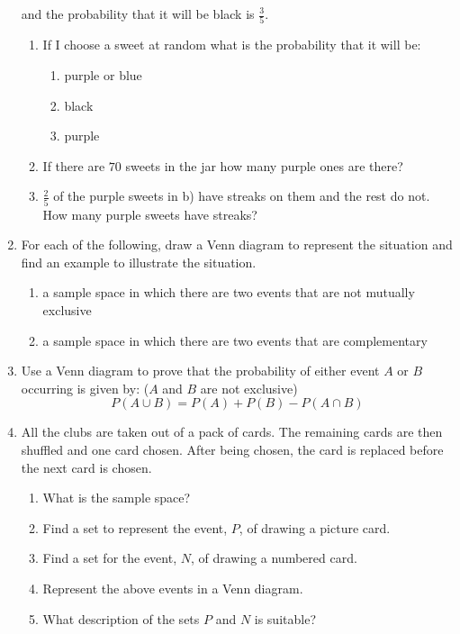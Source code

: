 \begin{eocexercises}{}
\begin{enumerate}[itemsep=5pt, label=\textbf{\arabic*}. ]
    and the probability that it will be black is $\frac{3}{5}$.
    \begin{enumerate}[noitemsep, label=\textbf{(\alph*)} ]
    \item If I choose a sweet at random what
      is the probability that it will be:
      \begin{enumerate}
      \item purple or blue
      \item black
      \item purple
      \end{enumerate}
    \item If there are $70$ sweets in the jar how many purple ones are
      there?
    \item $\frac{2}{5}$ of the purple sweets in b) have streaks on
      them and the rest do not. How many purple sweets have streaks?
    \end{enumerate}
\item For each of the following, draw a Venn diagram to represent
    the situation and find an example to illustrate the situation.
    \begin{enumerate}[noitemsep, label=\textbf{(\alph*)} ]
    \item a sample space in which there are two events that are not
      mutually exclusive
    \item a sample space in which there are two events that are
      complementary
    \end{enumerate}
\item Use a Venn diagram to prove that the probability of either
    event $A$ or $B$ occurring is given by: ($A$ and $B$ are not
    exclusive)
    \[P(A \cup B) = P(A) + P(B) - P(A \cap B)\]
\item All the clubs are taken out of a pack of cards. The remaining
    cards are then shuffled and one card chosen. After being chosen,
    the card is replaced before the next card is chosen.
    \begin{enumerate}[noitemsep, label=\textbf{(\alph*)} ]
    \item What is the sample space?
    \item Find a set to represent the event, $P$, of drawing a picture
      card.
    \item Find a set for the event, $N$, of drawing a numbered card.
    \item Represent the above events in a Venn diagram.
    \item What description of the sets $P$ and $N$ is suitable?

\end{enumerate}
\end{enumerate}
\end{eocexercises}
